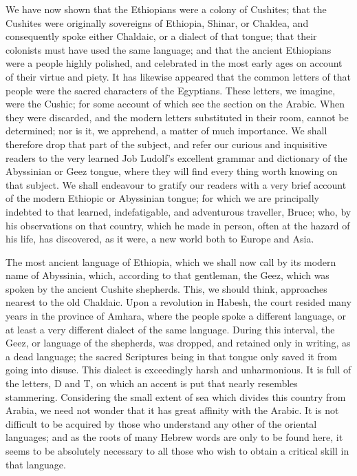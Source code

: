 \documentclass{article}
\begin{document}
We have now shown that the Ethiopians were a colony of Cushites; that the Cushites were originally sovereigns of Ethiopia, Shinar, or Chaldea, and consequently spoke either Chaldaic, or a dialect of that tongue; that their colonists must have used the same language; and that the ancient Ethiopians were a people highly polished, and celebrated in the most early ages on account of their virtue and piety. It has likewise appeared that the common letters of that people were the sacred characters of the Egyptians. These letters, we imagine, were the Cushic; for some account of which see the section on the Arabic. When they were discarded, and the modern letters substituted in their room, cannot be determined; nor is it, we apprehend, a matter of much importance. We shall therefore drop that part of the subject, and refer our curious and inquisitive readers to the very learned Job Ludolf's excellent grammar and dictionary of the Abyssinian or Geez tongue, where they will find every thing worth knowing on that subject. We shall endeavour to gratify our readers with a very brief account of the modern Ethiopic or Abyssinian tongue; for which we are principally indebted to that learned, indefatigable, and adventurous traveller, Bruce; who, by his observations on that country, which he made in person, often at the hazard of his life, has discovered, as it were, a new world both to Europe and Asia.

The most ancient language of Ethiopia, which we shall now call by its modern name of Abyssinia, which, according to that gentleman, the Geez, which was spoken by the ancient Cushite shepherds. This, we should think, approaches nearest to the old Chaldaic. Upon a revolution in Habesh, the court resided many years in the province of Amhara, where the people spoke a different language, or at least a very different dialect of the same language. During this interval, the Geez, or language of the shepherds, was dropped, and retained only in writing, as a dead language; the sacred Scriptures being in that tongue only saved it from going into disuse. This dialect is exceedingly harsh and unharmonious. It is full of the letters, D and T, on which an accent is put that nearly resembles stammering. Considering the small extent of sea which divides this country from Arabia, we need not wonder that it has great affinity with the Arabic. It is not difficult to be acquired by those who understand any other of the oriental languages; and as the roots of many Hebrew words are only to be found here, it seems to be absolutely necessary to all those who wish to obtain a critical skill in that language.
\end{document}
